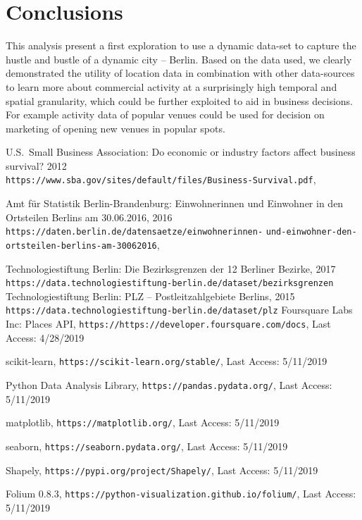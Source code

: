\documentclass[letter]{scrartcl}
\begin{document}
\section{Conclusions}

This analysis present a first exploration to use a dynamic data-set to capture the hustle and bustle of a dynamic city -- Berlin. Based on the data used, we clearly demonstrated the utility of location data in combination with other data-sources to learn more about commercial activity at a surprisingly high temporal and spatial granularity, which could be further exploited to aid in business decisions. For example activity data of popular venues could be used for decision on marketing of opening new venues in popular spots. 


\begin{thebibliography}{9}
U.S.~Small Business Association: Do economic or industry factors affect business survival? 2012 \\
\texttt{https://www.sba.gov/sites/default/files/Business-Survival.pdf}, 

Amt für Statistik Berlin-Brandenburg: Einwohnerinnen und Einwohner in den Ortsteilen Berlins am 30.06.2016, 2016 \\
\texttt{https://daten.berlin.de/datensaetze/einwohnerinnen-}
\texttt{und-einwohner-den-ortsteilen-berlins-am-30062016},   

 Technologiestiftung Berlin: Die Bezirksgrenzen der 12 Berliner Bezirke, 2017\\
 \texttt{https://data.technologiestiftung-berlin.de/dataset/bezirksgrenzen}  
 Technologiestiftung Berlin: PLZ -- Postleitzahlgebiete Berlins, 2015\\
 \texttt{https://data.technologiestiftung-berlin.de/dataset/plz}
 Foursquare Labs Inc: Places API, \texttt{https://https://developer.foursquare.com/docs}, Last Access: 4/28/2019
 
scikit-learn, \texttt{https://scikit-learn.org/stable/}, Last Access: 5/11/2019

Python Data Analysis Library, \texttt{https://pandas.pydata.org/}, Last Access: 5/11/2019

matplotlib, \texttt{https://matplotlib.org/}, Last Access: 5/11/2019

seaborn, \texttt{https://seaborn.pydata.org/}, Last Access: 5/11/2019

Shapely, \texttt{https://pypi.org/project/Shapely/}, Last Access: 5/11/2019

Folium 0.8.3, \texttt{https://python-visualization.github.io/folium/}, Last Access: 5/11/2019


\end{thebibliography}
\end{document}
